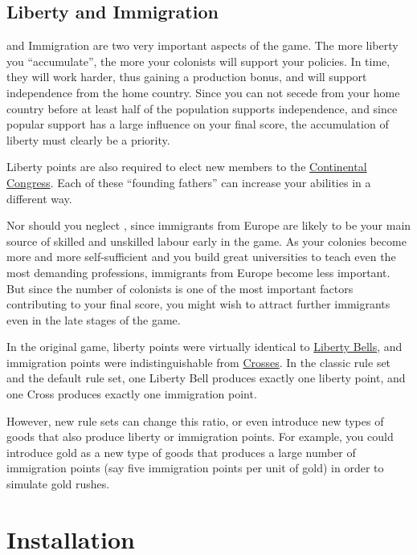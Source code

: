 \documentclass[12pt]{book}
\begin{document}
\hypertarget{Liberty and Immigration}{\section{Liberty and Immigration}}

 and Immigration are two very important aspects of
the game. The more liberty you ``accumulate'', the more your colonists
will support your policies. In time, they will work harder, thus
gaining a production bonus, and will support independence from the
home country. Since you can not secede from your home country before
at least half of the population supports independence, and since
popular support has a large influence on your final score, the
accumulation of liberty must clearly be a priority.

Liberty points are also required to elect new members to the
\hyperlink{Continental Congress}{Continental Congress}. Each of these
``founding fathers'' can increase your abilities in a different way.

Nor should you neglect , since immigrants from
Europe are likely to be your main source of skilled and unskilled
labour early in the game. As your colonies become more and more
self-sufficient and you build great universities to teach even the
most demanding professions, immigrants from Europe become less
important. But since the number of colonists is one of the most
important factors contributing to your final score, you might wish to
attract further immigrants even in the late stages of the game.

In the original game, liberty points were virtually identical to
\hyperlink{Liberty Bells}{Liberty Bells}, and immigration points were
indistinguishable from \hyperlink{Crosses}{Crosses}. In the classic
rule set and the default rule set, one Liberty Bell produces exactly
one liberty point, and one Cross produces exactly one immigration
point.

However, new rule sets can change this ratio, or even introduce new
types of goods that also produce liberty or immigration points. For
example, you could introduce gold as a new type of goods that produces
a large number of immigration points (say five immigration points per
unit of gold) in order to simulate gold rushes.



\hypertarget{Installation}{\chapter{Installation}}
\end{document}
